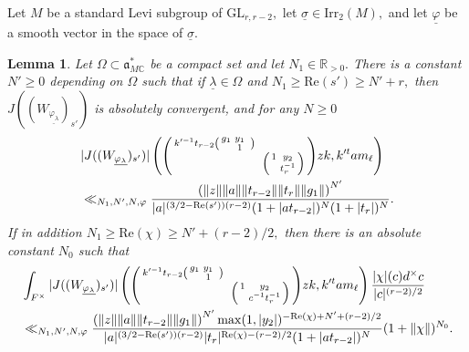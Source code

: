 \documentclass[12pt]{amsart}
\newtheorem{lem}[thm]{Lemma}
\theoremstyle{remark}
\numberwithin{equation}{section}
\newcommand{\GL}{\mathrm{GL}}
\newcommand{\CC}{\mathbb{C}}
\newcommand{\RR}{\mathbb{R}}
\theoremstyle{definition}
\newenvironment{psmatrix}
  {\left(\begin{smallmatrix}}
  {\end{smallmatrix}\right)}
\numberwithin{equation}{subsection}
\newcommand{\norm}[1]{\lVert#1\rVert}
\begin{document}
 Let $M$ be a standard Levi subgroup of $\GL_{r,r-2},$ let $\underline{\sigma}\in \mathrm{Irr}_2(M),$ and let $\underline{\varphi}$ be a smooth vector in the space of $\underline{\sigma}.$
\begin{lem} \label{lem:ZWlambda}
 Let $\Omega \subset \mathfrak{a}_{M\CC}^*$ be a compact set and let $N_1 \in \RR_{>0}.$  There is a constant $N'\ge 0$ depending on $\Omega$ such that if $\underline{\lambda}\in \Omega$ and $N_1 \ge \mathrm{Re}(s')\ge N'+r,$ then  $J((W_{\underline{\varphi_\lambda}})_{s'})$ is absolutely convergent, and for any $N\ge 0$
\begin{align*} 
&|J((W_{\underline{\varphi_\lambda}})_{s'})|\left(\begin{psmatrix}k'^{-1}t_{r-2}\begin{psmatrix} g_1 & y_1 & \\ & 1 \end{psmatrix} & \\ & &  \begin{psmatrix} 1  & y_2 \\ & t_r^{-1}\end{psmatrix}\end{psmatrix}zk, k'^tam_\ell\right)  \\ \nonumber
    &\ll_{N_1,N',N,\varphi} \frac{\left(\norm{z}\norm{a}\norm{t_{r-2}}\norm{t_r}\norm{g_1}\right)^{N'}}{|a|^{(3/2-\mathrm{Re}(s'))(r-2)}(1+|at_{r-2}|)^N(1+|t_r|)^N}.
\end{align*}
If in addition $N_1\ge \mathrm{Re}(\chi)\ge N'+(r-2)/2,$ then there is an absolute constant $N_0$ such that
\begin{align*}
    &\int_{F^\times} |J((W_{\underline{\varphi_\lambda}})_{s'})|\left(\begin{psmatrix}k'^{-1}t_{r-2}\begin{psmatrix} g_1 & y_1 & \\ & 1 \end{psmatrix} & \\ & &  \begin{psmatrix} 1  & y_2 \\ & c^{-1}t_r^{-1}\end{psmatrix}\end{psmatrix}zk, k'^tam_\ell \right)
\frac{|\chi|(c) d^\times c}{|c|^{(r-2)/2}}\\
&\ll_{N_1,N',N,\varphi} \frac{\left(\norm{z}\norm{a}\norm{t_{r-2}}\norm{g_1}\right)^{N'}\max(1,|y_2|)^{-\mathrm{Re}(\chi)+N'+(r-2)/2}}{|a|^{(3/2-\mathrm{Re}(s'))(r-2)}|t_r|^{\mathrm{Re}(\chi)-(r-2)/2}(1+|at_{r-2}|)^N}(1+\norm{\chi})^{N_0}.
\end{align*}
\end{lem}
\end{document}
